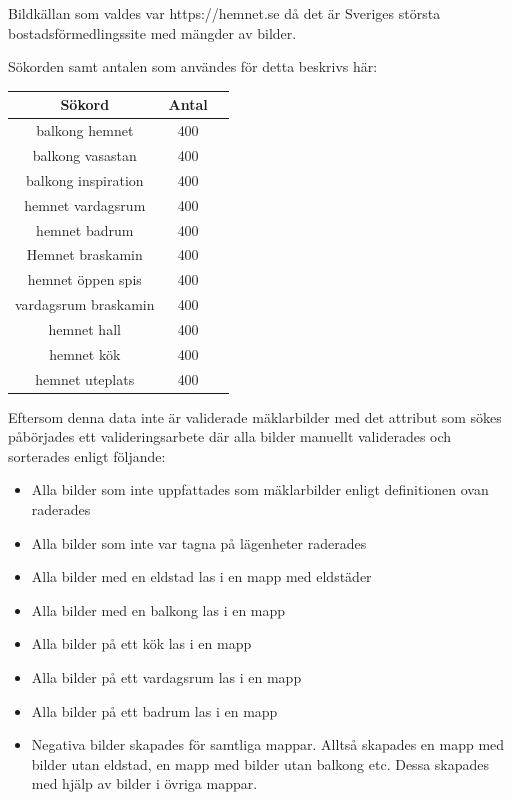 \documentclass{kththesis}
\begin{document}
Bildkällan som valdes var https://hemnet.se då det är Sveriges största bostadsförmedlingssite med mängder av bilder.

Sökorden samt antalen som användes för detta beskrivs här:

\begin{center}
  \begin{tabular}{ |c|c|c| } 
   \hline
   Sökord & Antal \\ 
   \hline
   balkong hemnet & 400  \\ 
   \hline
   balkong vasastan & 400 \\ 
   \hline
   balkong inspiration & 400 \\ 
   \hline
   hemnet vardagsrum & 400  \\ 
   \hline
   hemnet badrum & 400 \\ 
   \hline
   Hemnet braskamin & 400  \\ 
   \hline
   hemnet öppen spis & 400 \\ 
   \hline
   vardagsrum braskamin & 400 \\ 
   \hline
   hemnet hall & 400 \\ 
   \hline
   hemnet kök & 400 \\ 
   \hline
   hemnet uteplats & 400   \\ 
   \hline 
  \end{tabular}
  \end{center}

Eftersom denna data inte är validerade mäklarbilder med det attribut som sökes påbörjades ett valideringsarbete där alla bilder manuellt validerades och sorterades enligt följande:
\begin{itemize}
  \item Alla bilder som inte uppfattades som mäklarbilder enligt definitionen ovan raderades
  \item Alla bilder som inte var tagna på lägenheter raderades
  \item Alla bilder med en eldstad las i en mapp med eldstäder
  \item Alla bilder med en balkong las i en mapp
  \item Alla bilder på ett kök las i en mapp
  \item Alla bilder på ett vardagsrum las i en mapp
  \item Alla bilder på ett badrum las i en mapp
  \item Negativa bilder skapades för samtliga mappar. Alltså skapades en mapp med bilder utan eldstad, en mapp med bilder utan balkong etc. Dessa skapades med hjälp av bilder i övriga mappar. 
\end{itemize} 
\end{document}
